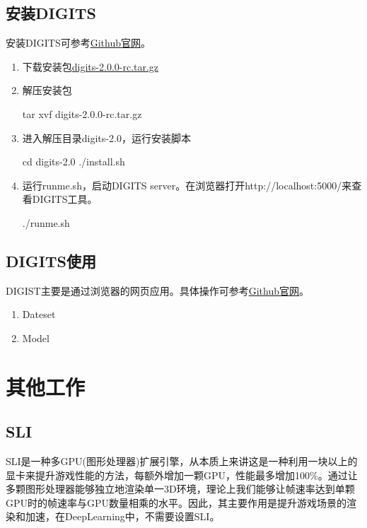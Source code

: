 \subsection{安装DIGITS}
安装DIGITS可参考\href{http://devblogs.nvidia.com/parallelforall/digits-deep-learning-gpu-training-system/}{Github官网}。
\begin{enumerate}
\item 下载安装包\href{https://developer.nvidia.com/digits}{digits-2.0.0-rc.tar.gz}
\item 解压安装包
\begin{bash}
tar xvf digits-2.0.0-rc.tar.gz
\end{bash}
\item 进入解压目录digits-2.0，运行安装脚本
\begin{bash}
cd digits-2.0
./install.sh
\end{bash}
\item 运行runme.sh，启动DIGITS server。在浏览器打开http://localhost:5000/来查看DIGITS工具。
\begin{bash}
./runme.sh
\end{bash}
\end{enumerate}

\subsection{DIGITS使用}
DIGIST主要是通过浏览器的网页应用。具体操作可参考\href{https://github.com/NVIDIA/DIGITS/blob/digits-2.0/docs/GettingStarted.md}{Github官网}。
\begin{enumerate}
\item Dateset
\item Model
\end{enumerate}


\section{其他工作}
\subsection{SLI}
SLI是一种多GPU(图形处理器)扩展引擎，从本质上来讲这是一种利用一块以上的显卡来提升游戏性能的方法，每额外增加一颗GPU，性能最多增加100\%。通过让多颗图形处理器能够独立地渲染单一3D环境，理论上我们能够让帧速率达到单颗GPU时的帧速率与GPU数量相乘的水平。因此，其主要作用是提升游戏场景的渲染和加速，在DeepLearning中，不需要设置SLI。


